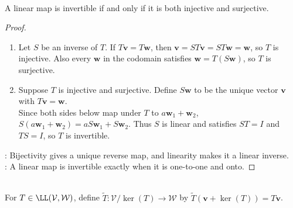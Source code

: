 \begin{proposition} \label{prop:linear-map-invertible-iff-bijective} \\
A linear map is invertible if and only if it is both injective and surjective.
\begin{proof}
\begin{enumerate}[label=\roman*.]
\setlength{\itemsep}{0pt}
\item[$(\Rightarrow)$] Let $S$ be an inverse of $T$. If $T\mathbf{v}=T\mathbf{w}$, then $\mathbf{v}=ST\mathbf{v}=ST\mathbf{w}=\mathbf{w}$, so $T$ is injective. Also every $\mathbf{w}$ in the codomain satisfies $\mathbf{w}=T(S\mathbf{w})$, so $T$ is surjective.
\item[$(\Leftarrow)$] Suppose $T$ is injective and surjective. Define $S\mathbf{w}$ to be the unique vector $\mathbf{v}$ with $T\mathbf{v}=\mathbf{w}$.\\
Since both sides below map under $T$ to $a\mathbf{w}_1+\mathbf{w}_2$, $S(a\mathbf{w}_1+\mathbf{w}_2)=aS\mathbf{w}_1+S\mathbf{w}_2$. Thus $S$ is linear and satisfies $ST=I$ and $TS=I$, so $T$ is invertible.
\end{enumerate}
: Bijectivity gives a unique reverse map, and linearity makes it a linear inverse.\\
: A linear map is invertible exactly when it is one-to-one and onto.
\end{proof}
\end{proposition}

\begin{definition} \\
For $T\in\LL(\mathcal{V},\mathcal{W})$, define $\widetilde{T}:\mathcal{V}/\ker(T)\to\mathcal{W}$ by $\widetilde{T}(\mathbf{v}+\ker(T))=T\mathbf{v}$.
\end{definition}

